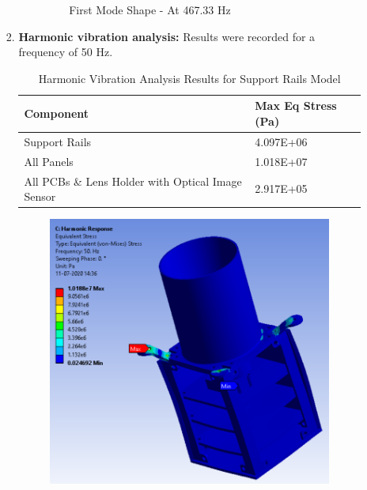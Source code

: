 \documentclass[../../main.tex]{subfiles}
\begin{document}
\begin{enumerate}
\begin{enumerate}
\begin{enumerate}
\begin{itemize}
\begin{figure}[H]
                    \caption{ First Mode Shape - At 467.33 Hz}
                    \label{fig:sys_CAD}
                \end{figure}
                \end{itemize}
                \newpage
                \item \textbf{Harmonic vibration analysis:} Results were recorded for a frequency of 50 Hz.
                \begin{table}[h!]
                    \centering
                    \begin{tabular}{|p{8cm}|p{3cm}|}
                        \hline
                        \textbf{Component} & \textbf{Max Eq Stress (Pa)} \\
                        \hline
                        
                        Support Rails & 4.097E+06 \\
                        \hline
                        All Panels & 1.018E+07 \\
                        \hline
                        All PCBs \& Lens Holder with Optical Image Sensor & 2.917E+05 \\
                        \hline
                    \end{tabular}
                    \caption{Harmonic Vibration Analysis Results for Support Rails Model}
                    \label{tab:my_label}
                \end{table}
                \begin{figure}[H]
                    \centering
                    \includegraphics[scale=0.9]{Figures/Mechanical/Harmonic_01.PNG}

\end{figure}
\end{enumerate}
\end{enumerate}
\end{enumerate}
\end{document}
